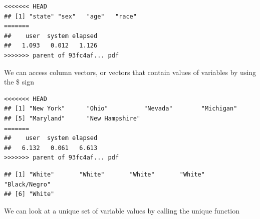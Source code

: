 \documentclass[]{book}
\newenvironment{Shaded}{\begin{snugshade}}{\end{snugshade}}
\newcommand{\KeywordTok}[1]{\textcolor[rgb]{0.13,0.29,0.53}{\textbf{#1}}}
\newcommand{\NormalTok}[1]{#1}
\newcommand{\OperatorTok}[1]{\textcolor[rgb]{0.81,0.36,0.00}{\textbf{#1}}}
\theoremstyle{definition}
\theoremstyle{definition}
\theoremstyle{definition}
\theoremstyle{remark}
\begin{document}
\begin{Shaded}
\begin{Highlighting}[]
\begin{Shaded}
\begin{Highlighting}[]
\begin{verbatim}
<<<<<<< HEAD
## [1] "state" "sex"   "age"   "race"
=======
##    user  system elapsed 
##   1.093   0.012   1.126
>>>>>>> parent of 93fc4af... pdf
\end{verbatim}

We can access column vectors, or vectors that contain values of variables by using the \$ sign

\begin{Shaded}
\end{Shaded}

\begin{verbatim}
<<<<<<< HEAD
## [1] "New York"      "Ohio"          "Nevada"        "Michigan"     
## [5] "Maryland"      "New Hampshire"
=======
##    user  system elapsed 
##   6.132   0.061   6.613
>>>>>>> parent of 93fc4af... pdf
\end{verbatim}

\begin{Shaded}
\end{Shaded}

\begin{verbatim}
## [1] "White"       "White"       "White"       "White"       "Black/Negro"
## [6] "White"
\end{verbatim}

We can look at a unique set of variable values by calling the unique function

\begin{Shaded}
\end{Shaded}


\end{Highlighting}
\end{Shaded}
\end{Highlighting}
\end{Shaded}
\end{document}

